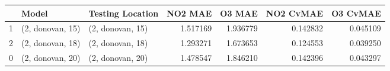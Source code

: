 \begin{tabular}{lllrrrr}
\toprule
{} &             Model &  Testing Location &   NO2 MAE &    O3 MAE &  NO2 CvMAE &  O3 CvMAE \\
\midrule
1 &  (2, donovan, 15) &  (2, donovan, 15) &  1.517169 &  1.936779 &   0.142832 &  0.045109 \\
2 &  (2, donovan, 18) &  (2, donovan, 18) &  1.293271 &  1.673653 &   0.124553 &  0.039250 \\
0 &  (2, donovan, 20) &  (2, donovan, 20) &  1.478547 &  1.846210 &   0.142396 &  0.043297 \\
\bottomrule
\end{tabular}
